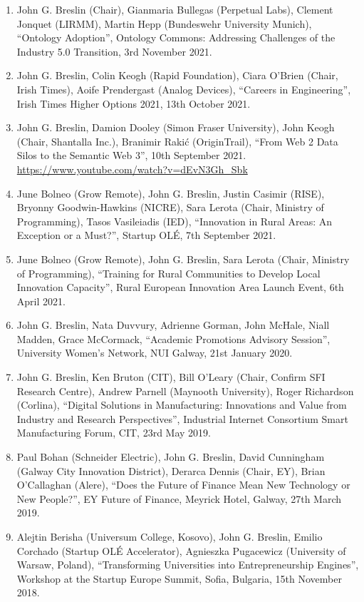 \documentclass[10pt,a4paper]{res} %
\begin{document}
\begin{resume}
\begin{enumerate}
\item John G. Breslin (Chair), Gianmaria Bullegas (Perpetual Labs), Clement Jonquet (LIRMM), Martin Hepp (Bundeswehr University Munich), ``Ontology Adoption'', Ontology Commons: Addressing Challenges of the Industry 5.0 Transition, 3rd November 2021.
\item John G. Breslin, Colin Keogh (Rapid Foundation), Ciara O'Brien (Chair, Irish Times), Aoife Prendergast (Analog Devices), ``Careers in Engineering'', Irish Times Higher Options 2021, 13th October 2021.
\item John G. Breslin, Damion Dooley (Simon Fraser University), John Keogh (Chair, Shantalla Inc.), Branimir Raki\'{c} (OriginTrail), ``From Web 2 Data Silos to the Semantic Web 3'', 10th September 2021. \url{https://www.youtube.com/watch?v=dEvN3Gh_Sbk}
\item June Bolneo (Grow Remote), John G. Breslin, Justin Casimir (RISE), Bryonny Goodwin-Hawkins (NICRE), Sara Lerota (Chair, Ministry of Programming), Tasos Vasileiadis (IED), ``Innovation in Rural Areas: An Exception or a Must?'', Startup OL\'{E}, 7th September 2021.
\item June Bolneo (Grow Remote), John G. Breslin, Sara Lerota (Chair, Ministry of Programming), ``Training for Rural Communities to Develop Local Innovation Capacity'', Rural European Innovation Area Launch Event, 6th April 2021.
\item John G. Breslin, Nata Duvvury, Adrienne Gorman, John McHale, Niall Madden, Grace McCormack, ``Academic Promotions Advisory Session'', University Women's Network, NUI Galway, 21st January 2020.
\item John G. Breslin, Ken Bruton (CIT), Bill O'Leary (Chair, Confirm SFI Research Centre), Andrew Parnell (Maynooth University), Roger Richardson (Corlina), ``Digital Solutions in Manufacturing: Innovations and Value from Industry and Research Perspectives'', Industrial Internet Consortium Smart Manufacturing Forum, CIT, 23rd May 2019.
\item Paul Bohan (Schneider Electric), John G. Breslin, David Cunningham (Galway City Innovation District), Derarca Dennis (Chair, EY), Brian O'Callaghan (Alere), ``Does the Future of Finance Mean New Technology or New People?'', EY Future of Finance, Meyrick Hotel, Galway, 27th March 2019.
\item Alejtin Berisha (Universum College, Kosovo), John G. Breslin, Emilio Corchado (Startup OL\'{E} Accelerator), Agnieszka Pugacewicz (University of Warsaw, Poland), ``Transforming Universities into Entrepreneurship Engines'', Workshop at the Startup Europe Summit, Sofia, Bulgaria, 15th November 2018.

\end{enumerate}
\end{resume}
\end{document}
